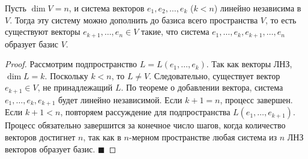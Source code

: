 \begin{theorem}
Пусть $\dim V = n$, и система векторов $e_1, e_2, \dots, e_k$ ($k < n$) линейно независима в $V$. Тогда эту систему можно дополнить до базиса всего пространства $V$, то есть существуют векторы $e_{k+1}, \dots, e_n \in V$ такие, что система $e_1, \dots, e_k, e_{k+1}, \dots, e_n$ образует базис $V$.
\end{theorem}

\begin{proof}
Рассмотрим подпространство $L = L(e_1, \dots, e_k)$. Так как векторы ЛНЗ, $\dim L = k$. Поскольку $k < n$, то $L \neq V$. 
Следовательно, существует вектор $e_{k+1} \in V$, не принадлежащий $L$. По теореме о добавлении вектора, система $e_1, \dots, e_k, e_{k+1}$ будет линейно независимой. 
Если $k+1 = n$, процесс завершен. Если $k+1 < n$, повторяем рассуждение для подпространства $L(e_1, \dots, e_{k+1})$. Процесс обязательно завершится за конечное число шагов, когда количество векторов достигнет $n$, так как в $n$-мерном пространстве любая система из $n$ ЛНЗ векторов образует базис.
\hfill$\blacksquare$
\end{proof}
